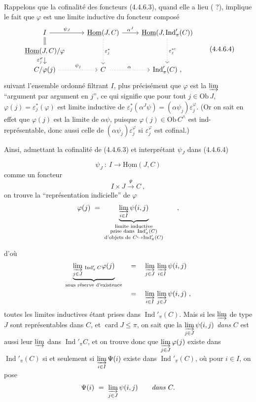 \documentclass[11pt]{article}
\newcommand{\printedpage}[1]{\if\relax\detokenize{#1}\relax\else\marginpar{\footnotesize p.~#1}\fi}
\newcommand{\msp}[1]{\marginpar{\footnotesize [#1]}}
\newcommand{\uHom}{\underline{\mathrm{Hom}}}
\newcommand{\Ob}{\mathrm{Ob}\,}
\newcommand{\card}{\operatorname{card}}
\newcommand{\Ind}{\operatorname{Ind}}
\begin{document}
\msp{page 85}
Rappelons que la cofinalité des foncteurs (4.4.6.3), quand elle a lieu ( ?), implique le fait que $\varphi$ est une limite inductive du foncteur composé
\[
\begin{tikzcd}[row sep=small]
I \arrow[r, "\psi_J"] \arrow[d, equal] & \uHom(J,C) \arrow[r, "\alpha^J"] \arrow[dd, dotted, "\varepsilon_j^*"] & \uHom(J,\Ind'_\pi(C)) \arrow[dd, dotted, "{\varepsilon_j^{*\prime}}"] \\
\uHom(J,C)/\varphi \arrow[d, "\varepsilon_j^\varphi"'] & & \\
C/\varphi(j) \arrow[r, dotted, "\psi_j"] & C \arrow[r, dotted, "\alpha"] & \Ind'_\pi(C)\ ,
\end{tikzcd}
\tag*{(4.4.6.4)}
\]
suivant l'ensemble ordonné filtrant $I$, plus précisément que $\varphi$ est la $\varinjlim$ “argument par argument en $j$”, ce qui signifie que pour tout $j \in \Ob J$, $\varphi(j) = \varepsilon_j^*(\varphi)$ est limite inductive de $\varepsilon_j^*(\alpha^J\psi) = (\alpha\psi_j)\varepsilon_j^\varphi$. (Or on sait en effet que $\varphi(j)$ est la limite de $\alpha\psi$, puisque $\varphi(j) \in \Ob C^\wedge$ est ind-représentable, donc aussi celle de $(\alpha\psi_j)\varepsilon_j^\varphi$ si $\varepsilon_j^\varphi$ est cofinal.)

Ainsi, admettant la cofinalité de (4.4.6.3) et interprétant $\psi_J$ dans (4.4.6.4)

\msp{page 86}
\[
\psi_J \ :\ I \longrightarrow \uHom(J,C)
\]
comme un foncteur
\[
I \times J \xrightarrow{\Psi} C\ , %
\]
on trouve la “représentation indicielle” de $\varphi$
\[
\varphi(j) \ =\ \underbrace{\varinjlim_{i\in I} \psi(i,j)}_{\substack{\text{limite inductive}\\ \text{prise dans } \Ind'_\pi(C)\\ \text{d'objets de } C \hookrightarrow \Ind'_\pi(C)}} \qquad ,
\]

\printedpage{20}
d'où
\[
\begin{aligned}
\underbrace{\varinjlim_{j\in J}{}_{\,\Ind'_\pi C}\varphi(j)}_{\text{sous réserve d'existence}} \quad &= \quad \varinjlim_{j\in J}\, \varinjlim_{i\in I} \psi(i,j)\\
&= \quad \varinjlim_{i\in I}\, \varinjlim_{j\in J} \psi(i,j)\ ,
\end{aligned}
\]
toutes les limites inductives étant prises dans $\Ind'_\pi(C)$. Mais si les $\varinjlim$ de type $J$ sont représentables dans $C$, et $\card J \leqslant \pi$, on sait que la $\varinjlim\limits_{j\in J} \psi(i,j)$ \textit{dans} $C$ est aussi leur $\varinjlim$ dans $\Ind'_\pi C$, et on trouve donc que $\varinjlim\limits_{j\in J} \varphi(j)$ existe dans $\Ind'_\pi(C)$ si et seulement si $\varinjlim\limits_{i\in I} \Psi(i)$ existe dans $\Ind'_\pi(C)$, où pour $i \in I$, on pose
\[
\Psi(i) \ =\ \varinjlim_{j\in J} \psi(i,j) \qquad \textit{dans } C.
\]
\end{document}
